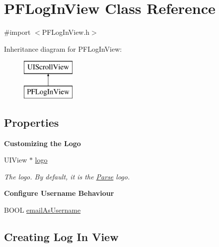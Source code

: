 \hypertarget{interface_p_f_log_in_view}{}\section{P\+F\+Log\+In\+View Class Reference}
\label{interface_p_f_log_in_view}


{\ttfamily \#import $<$P\+F\+Log\+In\+View.\+h$>$}

Inheritance diagram for P\+F\+Log\+In\+View\+:\begin{figure}[H]
\begin{center}
\leavevmode
\includegraphics[height=2.000000cm]{interface_p_f_log_in_view}
\end{center}
\end{figure}
\subsection*{Properties}
\begin{Indent}{\bf Customizing the Logo}\par
{\em 

 

 }\begin{DoxyCompactItemize}
\item 
U\+I\+View $\ast$ \hyperlink{interface_p_f_log_in_view_a0d6b5139aea2f3c3a86b3093f7258455}{logo}
\begin{DoxyCompactList}\small\item\em The logo. By default, it is the \hyperlink{interface_parse}{Parse} logo. \end{DoxyCompactList}\end{DoxyCompactItemize}
\end{Indent}
\begin{Indent}{\bf Configure Username Behaviour}\par
{\em 

 

 }\begin{DoxyCompactItemize}
\item 
B\+O\+O\+L \hyperlink{interface_p_f_log_in_view_a5158167a0a95cdf25f18e5fe23a8368b}{email\+As\+Username}
\end{DoxyCompactItemize}
\end{Indent}
\subsection*{Creating Log In View}
\label{_amgrpc8428f71b0802c997724718279eeb751}%


